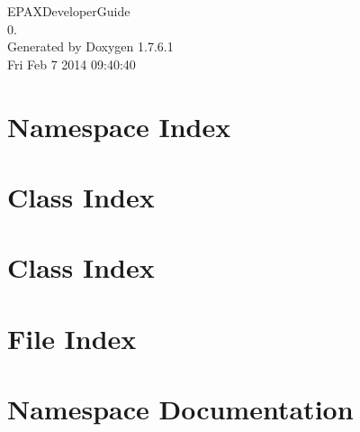 \documentclass[a4paper]{book}
\begin{document}
\hypersetup{pageanchor=false,citecolor=blue}
\begin{titlepage}
\vspace*{7cm}
\begin{center}
{\Large \-E\-P\-A\-X\-Developer\-Guide \\[1ex]\large 0. }\\
\vspace*{1cm}
{\large \-Generated by Doxygen 1.7.6.1}\\
\vspace*{0.5cm}
{\small Fri Feb 7 2014 09:40:40}\\
\end{center}
\end{titlepage}
\clearemptydoublepage
{}
\tableofcontents
\clearemptydoublepage
{}
\hypersetup{pageanchor=true,citecolor=blue}
\chapter{\-Namespace \-Index}

\chapter{\-Class \-Index}

\chapter{\-Class \-Index}

\chapter{\-File \-Index}

\chapter{\-Namespace \-Documentation}




\end{document}
